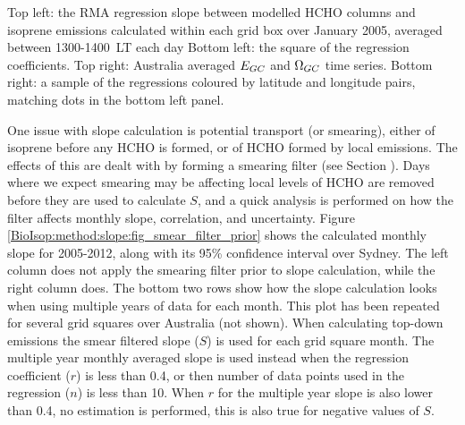     
    { %
      Top left: the RMA regression slope between modelled HCHO columns and isoprene emissions calculated within each grid box over January 2005, averaged between 1300-1400~LT each day
      Bottom left: the square of the regression coefficients.
      Top right: Australia averaged $E_{GC}$ and $\Omega_{GC}$ time series.
      Bottom right: a sample of the regressions coloured by latitude and longitude pairs, matching dots in the bottom left panel.
    }
    {\label{BioIsop:method:slope:fig_regressions}}
    
    
    
    One issue with slope calculation is potential transport (or smearing), either of isoprene before any HCHO is formed, or of HCHO formed by local emissions.
    The effects of this are dealt with by forming a smearing filter (see Section ).
    Days where we expect smearing may be affecting local levels of HCHO are removed before they are used to calculate $S$, and a quick analysis is performed on how the filter affects monthly slope, correlation, and uncertainty.
    Figure \ref{BioIsop:method:slope:fig_smear_filter_prior} shows the calculated monthly slope for 2005-2012, along with its 95\% confidence interval over Sydney.
    The left column does not apply the smearing filter prior to slope calculation, while the right column does.
    The bottom two rows show how the slope calculation looks when using multiple years of data for each month.
    This plot has been repeated for several grid squares over Australia (not shown).
    When calculating top-down emissions the smear filtered slope ($S$) is used for each grid square month.
    The multiple year monthly averaged slope is used instead when the regression coefficient ($r$) is less than 0.4, or then number of data points used in the regression ($n$) is less than 10.
    When $r$ for the multiple year slope is also lower than 0.4, no estimation is performed, this is also true for negative values of $S$.
    
    
